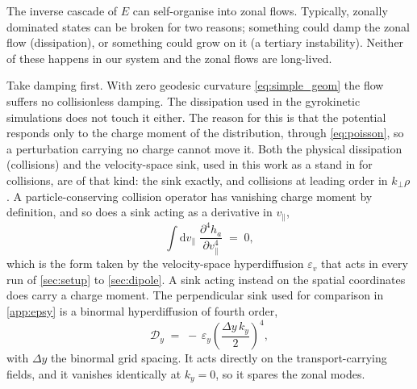 \documentclass{jpp}
\newcommand{\rmd}{\text{d}}
\newcommand{\kperp}{k_\perp}
\newcommand{\vpar}{v_\parallel}
\begin{document}
The inverse cascade of $E$ can self-organise into zonal flows. Typically, zonally dominated states can be broken for two reasons; something could damp the zonal flow (dissipation), or something could grow on it (a tertiary instability). Neither of these happens in our system and the zonal flows are long-lived. 

Take damping first. With zero geodesic curvature \cref{eq:simple_geom} the flow suffers no collisionless damping. The dissipation used in the gyrokinetic simulations does not touch it either. The reason for this is that the potential responds only to the charge moment of the distribution, through \cref{eq:poisson}, so a perturbation carrying no charge cannot move it. Both the physical dissipation (collisions) and the velocity-space sink, used in this work as a stand in for collisions, are of that kind: the sink exactly, and collisions at leading order in $\kperp\rho$. A particle-conserving collision operator has vanishing charge moment by definition, and so does a sink acting as a derivative in $\vpar$,
\begin{equation}\label{eq:hypv_charge}
\int \rmd \vpar\; \frac{\partial^4 h_a}{\partial \vpar^4} \;=\; 0 ,
\end{equation}
which is the form taken by the velocity-space hyperdiffusion $\varepsilon_v$ that acts in every run of \cref{sec:setup} to \cref{sec:dipole}. A sink acting instead on the spatial coordinates does carry a charge moment. The perpendicular sink used for comparison in \cref{app:epsy} is a binormal hyperdiffusion of fourth order,
\begin{equation}\label{eq:hypy}
\mathcal{D}_y \;=\; -\,\varepsilon_y\left(\frac{\Delta y\,k_y}{2}\right)^{4},
\end{equation}
with $\Delta y$ the binormal grid spacing. It acts directly on the transport-carrying fields, and it vanishes identically at $k_y = 0$, so it spares the zonal modes. 
\end{document}
